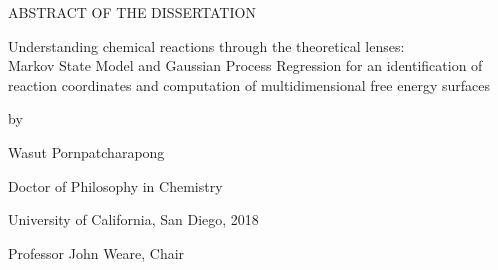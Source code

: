 \newpage

\begingroup
\vspace*{1.5in}
\begin{center}
    {ABSTRACT OF THE DISSERTATION}
\end{center}
\endgroup

\vspace{1.2cm}

\begin{center}
    \begin{spacing}{1.0}
    {Understanding chemical reactions through the theoretical lenses: \\
    Markov State Model and Gaussian Process Regression for an identification of \\
    reaction coordinates and computation of multidimensional free energy surfaces}
    \end{spacing}

    \vspace{0.6cm}

    by

    \vspace{0.6cm}

    \begin{spacing}{1.0}
        Wasut Pornpatcharapong

        Doctor of Philosophy in Chemistry

        University of California, San Diego, 2018
    \end{spacing}

    \vspace{0.6cm}

    Professor John Weare, Chair
\end{center}

\vspace{0.6cm}

